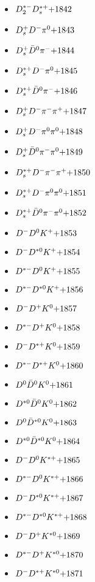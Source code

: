 \begin{multicols}{3}
\begin{itemize}
 \item $ D_{2}^{*-} D_{s}^{*+} \hfill{+1842}$
 \item $ D_{s}^{+} D^{-} \pi^{0} \hfill{+1843}$
 \item $ D_{s}^{+} \bar{D}^{0} \pi^{-} \hfill{+1844}$
 \item $ D_{s}^{*+} D^{-} \pi^{0} \hfill{+1845}$
 \item $ D_{s}^{*+} \bar{D}^{0} \pi^{-} \hfill{+1846}$
 \item $ D_{s}^{+} D^{-} \pi^{-} \pi^{+} \hfill{+1847}$
 \item $ D_{s}^{+} D^{-} \pi^{0} \pi^{0} \hfill{+1848}$
 \item $ D_{s}^{+} \bar{D}^{0} \pi^{-} \pi^{0} \hfill{+1849}$
 \item $ D_{s}^{*+} D^{-} \pi^{-} \pi^{+} \hfill{+1850}$
 \item $ D_{s}^{*+} D^{-} \pi^{0} \pi^{0} \hfill{+1851}$
 \item $ D_{s}^{*+} \bar{D}^{0} \pi^{-} \pi^{0} \hfill{+1852}$
 \item $ D^{-} D^{0} K^{+} \hfill{+1853}$
 \item $ D^{-} D^{*0} K^{+} \hfill{+1854}$
 \item $ D^{*-} D^{0} K^{+} \hfill{+1855}$
 \item $ D^{*-} D^{*0} K^{+} \hfill{+1856}$
 \item $ D^{-} D^{+} K^{0} \hfill{+1857}$
 \item $ D^{*-} D^{+} K^{0} \hfill{+1858}$
 \item $ D^{-} D^{*+} K^{0} \hfill{+1859}$
 \item $ D^{*-} D^{*+} K^{0} \hfill{+1860}$
 \item $ D^{0} \bar{D}^{0} K^{0} \hfill{+1861}$
 \item $ D^{*0} \bar{D}^{0} K^{0} \hfill{+1862}$
 \item $ D^{0} \bar{D}^{*0} K^{0} \hfill{+1863}$
 \item $ D^{*0} \bar{D}^{*0} K^{0} \hfill{+1864}$
 \item $ D^{-} D^{0} K^{*+} \hfill{+1865}$
 \item $ D^{*-} D^{0} K^{*+} \hfill{+1866}$
 \item $ D^{-} D^{*0} K^{*+} \hfill{+1867}$
 \item $ D^{*-} D^{*0} K^{*+} \hfill{+1868}$
 \item $ D^{-} D^{+} K^{*0} \hfill{+1869}$
 \item $ D^{*-} D^{+} K^{*0} \hfill{+1870}$
 \item $ D^{-} D^{*+} K^{*0} \hfill{+1871}$

\end{itemize}
\end{multicols}
